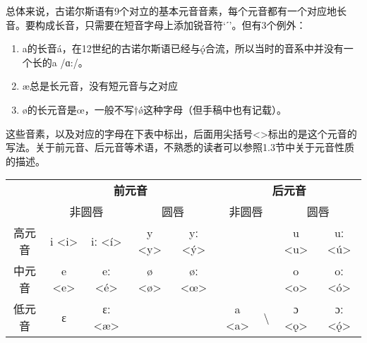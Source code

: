 总体来说，古诺尔斯语有9个对立的基本元音音素，每个元音都有一个对应地长音。要构成长音，只需要在短音字母上添加锐音符`ˊ'。但有3个例外：
\begin{info}
\begin{enumerate}[leftmargin=*]
    \item a的长音á，在12世纪的古诺尔斯语已经与ǫ́合流，所以当时的音系中并没有一个长的a /ɑ:/。
    \item æ总是长元音，没有短元音与之对应 \footnotemark
    \item ø的长元音是œ，一般不写†\'{ø}这种字母（但手稿中也有记载）。
\end{enumerate}
\end{info}


这些音素，以及对应的字母在下表中标出，后面用尖括号<>标出的是这个元音的写法。关于前元音、后元音等术语，不熟悉的读者可以参照1.3节中关于元音性质的描述。

\begin{table}[H]
\centering
\begin{tabular}{@{}ccccccccc@{}}
\toprule
    & \multicolumn{4}{c}{\textbf{前元音}}                                                                                            & \multicolumn{4}{c}{\textbf{后元音}}                                                                                \\ \cmidrule(l){2-9} 
    & \multicolumn{2}{c}{非圆唇}                                      & \multicolumn{2}{c}{圆唇}                                       & \multicolumn{2}{c}{非圆唇}                         & \multicolumn{2}{c}{圆唇}                                        \\ \cmidrule(l){2-9} 
高元音 & i \textless{}i\textgreater{} & iː \textless{}í\textgreater{} & y \textless{}y\textgreater{} & yː \textless{}ý\textgreater{} &                              &                  & u \textless{}u\textgreater{} & uː \textless{}ú\textgreater{}  \\
中元音 & e \textless{}e\textgreater{} & eː \textless{}é\textgreater{} & ø \textless{}ø\textgreater{} & øː \textless{}œ\textgreater{} &                              &                  & o \textless{}o\textgreater{} & oː \textless{}ó\textgreater{}  \\
低元音 & ɛ                            & ɛː \textless{}æ\textgreater{} &                              &                               & a \textless{}a\textgreater{} & \textbackslash{} & ɔ \textless{}ǫ\textgreater{} & ɔː \textless{}ǫ́\textgreater{} \\ \bottomrule
\end{tabular}
\end{table}

